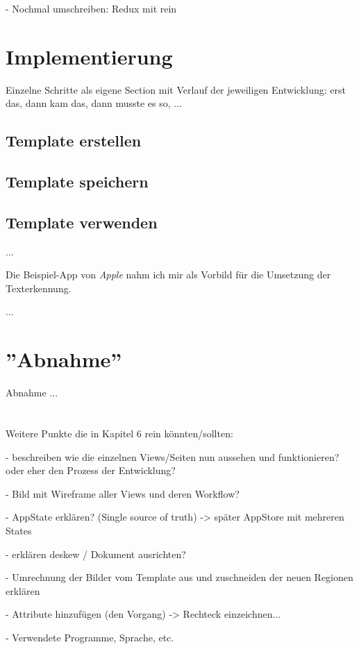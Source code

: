 \documentclass[nomenclature, 150]{HSMW-Thesis}
\begin{document}
		- Nochmal umschreiben: Redux mit rein	
	\section{Implementierung}
		
		Einzelne Schritte als eigene Section mit Verlauf der jeweiligen Entwicklung: erst das, dann kam das, dann musste es so, ...
			
		\subsection{Template erstellen}
		
		\subsection{Template speichern}
		
		\subsection{Template verwenden}
		
		...
		
		Die Beispiel-App von \textit{Apple} nahm ich mir als Vorbild für die Umsetzung der Texterkennung.
		
		...
		
	\section{''Abnahme''}	
		Abnahme ... \\ \\ \\
	
	
	Weitere Punkte die in Kapitel 6 rein könnten/sollten: 
	
	- beschreiben wie die einzelnen Views/Seiten nun aussehen und funktionieren? oder eher den Prozess der Entwicklung?
	
	- Bild mit Wireframe aller Views und deren Workflow?
	
	- AppState erklären? (Single source of truth) -> später AppStore mit mehreren States
	
	- erklären deskew / Dokument ausrichten?
	
	- Umrechnung der Bilder vom Template aus und zuschneiden der neuen Regionen erklären
	
	- Attribute hinzufügen (den Vorgang) -> Rechteck einzeichnen...
	
	- Verwendete Programme, Sprache, etc. 
	
\end{document}
